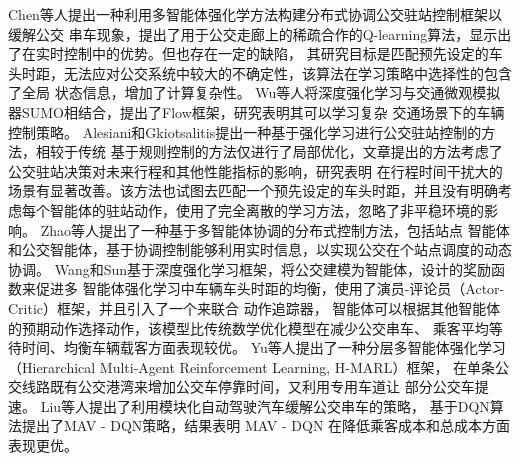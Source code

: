 Chen等人\cite{chen2016real}提出一种利用多智能体强化学方法构建分布式协调公交驻站控制框架以缓解公交
串车现象，提出了用于公交走廊上的稀疏合作的Q-learning算法，显示出了在实时控制中的优势。但也存在一定的缺陷，
其研究目标是匹配预先设定的车头时距，无法应对公交系统中较大的不确定性，该算法在学习策略中选择性的包含了全局
状态信息，增加了计算复杂性。
Wu等人\cite{wu2017flow}将深度强化学习与交通微观模拟器SUMO相结合，提出了Flow框架，研究表明其可以学习复杂
交通场景下的车辆控制策略。
Alesiani和Gkiotsalitis\cite{alesiani2018reinforcement}提出一种基于强化学习进行公交驻站控制的方法，相较于传统
基于规则控制的方法仅进行了局部优化，文章提出的方法考虑了公交驻站决策对未来行程和其他性能指标的影响，研究表明
在行程时间干扰大的场景有显著改善。该方法也试图去匹配一个预先设定的车头时距，并且没有明确考虑每个智能体的驻站动作，使用了完全离散的学习方法，忽略了非平稳环境的影响。
Zhao等人\cite{zhao2003distributed}提出了一种基于多智能体协调的分布式控制方法，包括站点
智能体和公交智能体，基于协调控制能够利用实时信息，以实现公交在个站点调度的动态协调。
Wang和Sun\cite{wang2020dynamic}基于深度强化学习框架，将公交建模为智能体，设计的奖励函数来促进多
智能体强化学习中车辆车头时距的均衡，使用了演员-评论员（Actor-Critic）框架，并且引入了一个来联合
动作追踪器，
智能体可以根据其他智能体的预期动作选择动作，该模型比传统数学优化模型在减少公交串车、
乘客平均等待时间、均衡车辆载客方面表现较优。
Yu等人\cite{yu2024mitigating}提出了一种分层多智能体强化学习（Hierarchical Multi-Agent Reinforcement Learning, H-MARL）框架，
在单条公交线路既有公交港湾来增加公交车停靠时间，又利用专用车道让
部分公交车提速。
Liu等人\cite{liu2024alleviating}提出了利用模块化自动驾驶汽车缓解公交串车的策略，
基于DQN算法提出了MAV - DQN策略，结果表明 MAV - DQN 在降低乘客成本和总成本方面表现更优。

